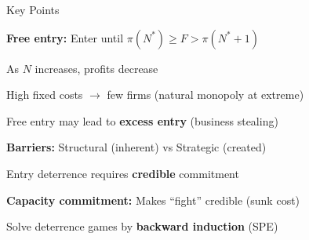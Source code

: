 \documentclass[notes,11pt, aspectratio=169]{beamer}
\newenvironment{wideenumerate}{\enumerate\addtolength{\itemsep}{10pt}}{\endenumerate}
\begin{document}

\begin{frame}{Key Points}
	\vspace{11pt}
	\begin{wideenumerate}
		\item \textbf{Free entry:} Enter until $\pi(N^*) \geq F > \pi(N^* + 1)$
		\item As $N$ increases, profits decrease
		\item High fixed costs $\rightarrow$ few firms (natural monopoly at extreme)
		\item Free entry may lead to \textbf{excess entry} (business stealing)
		\item \textbf{Barriers:} Structural (inherent) vs Strategic (created)
		\item Entry deterrence requires \textbf{credible} commitment
		\item \textbf{Capacity commitment:} Makes ``fight'' credible (sunk cost)
		\item Solve deterrence games by \textbf{backward induction} (SPE)
	\end{wideenumerate}
\end{frame}
\end{document}
